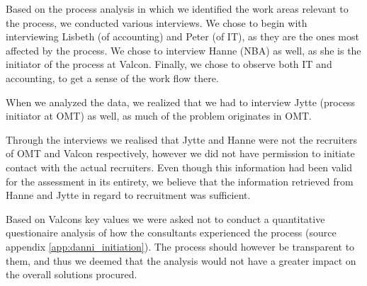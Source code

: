 Based on the process analysis in which we identified the work areas relevant to the process, we conducted various interviews.
We chose to begin with interviewing Lisbeth (of accounting) and Peter (of IT), as they are the ones most affected by the process.
We chose to interview Hanne (NBA) as well, as she is the initiator of the process at Valcon.
Finally, we chose to observe both IT and accounting, to get a sense of the work flow there.

When we analyzed the data, we realized that we had to interview Jytte (process initiator at OMT) as well, as much of the problem originates in OMT.

Through the interviews we realised that Jytte and Hanne were not the recruiters of OMT and Valcon respectively, however we did not have permission to initiate contact with the actual recruiters.
Even though this information had been valid for the assessment in its entirety, we believe that the information retrieved from Hanne and Jytte in regard to recruitment was sufficient.

Based on Valcons key values we were asked not to conduct a quantitative questionaire analysis of how the consultants experienced the process (source appendix \ref{app:danni_initiation}). The process should however be transparent to them, and thus we deemed that the analysis would not have a greater impact on the overall solutions procured.